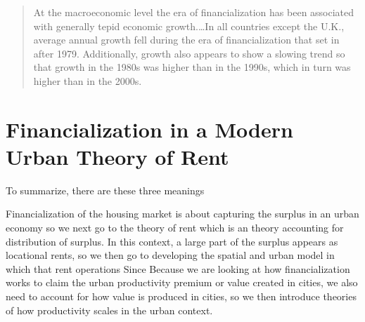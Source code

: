 \begin{quotation}At the macroeconomic level the era of financialization has been associated with generally tepid economic growth.\dots  In all countries except the U.K., average annual growth fell during the era of financialization that set in after 1979. Additionally, growth also appears to show a slowing trend so that growth in the 1980s was higher than in the 1990s, which in turn was higher than in the 2000s. \end{quotation}


\section{Financialization in a Modern Urban Theory of Rent}

To summarize, there are these three meanings 

Financialization of the housing market is about capturing the surplus in an urban economy so we next go to the theory of rent which is an theory accounting for distribution of surplus. In this context, a large part of the surplus appears as locational rents, so we then go to developing the spatial and urban model in which that rent operations  Since Because we are looking at how financialization works to claim the urban productivity premium or value created in cities, we also need to account for how value is produced in cities, so we then introduce theories of how productivity scales in the urban context.


